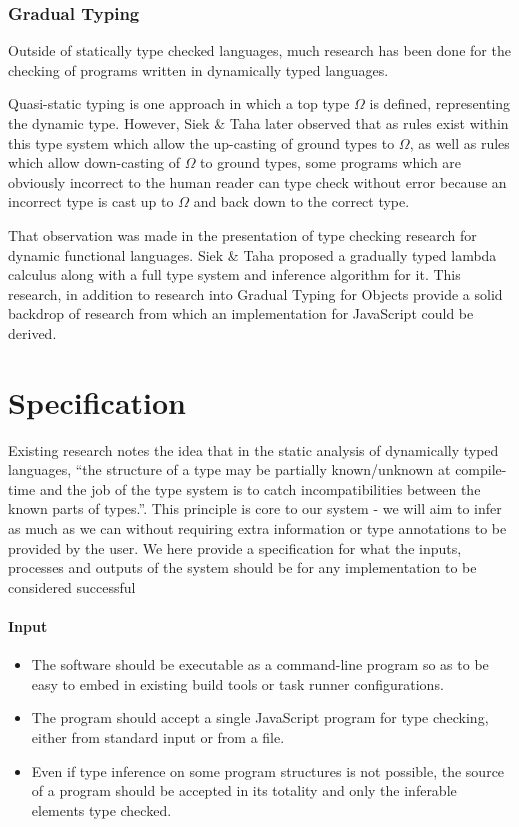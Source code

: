 \documentclass[british, twoside]{bhamthesis}
\theoremstyle{definition}
\begin{document}
    \subsection{Gradual Typing}
      Outside of statically type checked languages, much research has been done for the checking of programs written in dynamically typed languages.

      Quasi-static typing\autocite{Thatte1989} is one approach in which a top type $\Omega$ is defined, representing the dynamic type. However, Siek \& Taha later observed that as rules exist within this type system which allow the up-casting of ground types to $\Omega$, as well as rules which allow down-casting of $\Omega$ to ground types, some programs which are obviously incorrect to the human reader can type check without error because an incorrect type is cast up to $\Omega$ and back down to the correct type\autocite{Siek2006}.

      That observation was made in the presentation of type checking research for dynamic functional languages. Siek \& Taha proposed a gradually typed lambda calculus along with a full type system and inference algorithm for it\autocite{Siek2006}. This research, in addition to research into Gradual Typing for Objects\autocite{Siek2007} provide a solid backdrop of research from which an implementation for JavaScript could be derived.


\chapter{Specification}

  Existing research notes the idea that in the static analysis of dynamically typed languages, ``the structure of a type may be partially known/unknown at compile-time and the job of the type system is to catch incompatibilities between the known parts of types.''\autocite{Siek2006}. This principle is core to our system - we will aim to infer as much as we can without requiring extra information or type annotations to be provided by the user. We here provide a specification for what the inputs, processes and outputs of the system should be for any implementation to be considered successful

  \subsubsection{Input}
  \begin{itemize}
    \item The software should be executable as a command-line program so as to be easy to embed in existing build tools or task runner configurations.
    \item The program should accept a single JavaScript program for type checking, either from standard input or from a file.
    \item Even if type inference on some program structures is not possible, the source of a program should be accepted in its totality and only the inferable elements type checked.
  \end{itemize}
\end{document}
